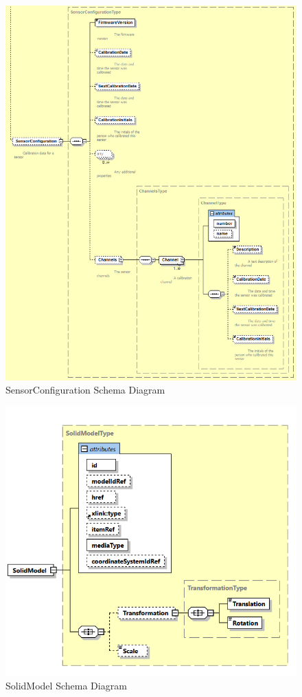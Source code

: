 \begin{figure}[ht]
  \centering
    \includegraphics[width=1.0\textwidth]{figures/SensorConfiguration Schema.png}
  \caption{SensorConfiguration Schema Diagram}
  \label{fig:SensorConfiguration Schema Diagram}
\end{figure}

\FloatBarrier


\begin{figure}[ht]
  \centering
    \includegraphics[width=1.0\textwidth]{figures/SolidModel Schema.png}
  \caption{SolidModel Schema Diagram}
  \label{fig:SolidModel Schema Diagram}
\end{figure}

